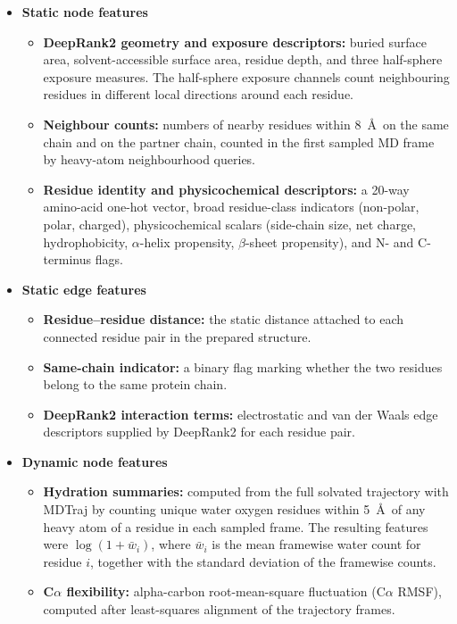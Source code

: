 \begin{itemize}
\item \textbf{Static node features}
  \begin{itemize}
  \item \textbf{DeepRank2 geometry and exposure descriptors:} buried surface area, solvent-accessible surface area, residue depth, and three half-sphere exposure measures. The half-sphere exposure channels count neighbouring residues in different local directions around each residue.
  \item \textbf{Neighbour counts:} numbers of nearby residues within 8~\AA\ on the same chain and on the partner chain, counted in the first sampled MD frame by heavy-atom neighbourhood queries.
  \item \textbf{Residue identity and physicochemical descriptors:} a 20-way amino-acid one-hot vector, broad residue-class indicators (non-polar, polar, charged), physicochemical scalars (side-chain size, net charge, hydrophobicity, $\alpha$-helix propensity, $\beta$-sheet propensity), and N- and C-terminus flags.
  \end{itemize}
\item \textbf{Static edge features}
  \begin{itemize}
  \item \textbf{Residue--residue distance:} the static distance attached to each connected residue pair in the prepared structure.
  \item \textbf{Same-chain indicator:} a binary flag marking whether the two residues belong to the same protein chain.
  \item \textbf{DeepRank2 interaction terms:} electrostatic and van der Waals edge descriptors supplied by DeepRank2 for each residue pair.
  \end{itemize}
\item \textbf{Dynamic node features}
  \begin{itemize}
  \item \textbf{Hydration summaries:} computed from the full solvated trajectory with MDTraj \citep{McGibbon2015MDTraj} by counting unique water oxygen residues within 5~\AA\ of any heavy atom of a residue in each sampled frame. The resulting features were $\log(1+\bar{w}_i)$, where $\bar{w}_i$ is the mean framewise water count for residue $i$, together with the standard deviation of the framewise counts.
  \item \textbf{C$\alpha$ flexibility:} alpha-carbon root-mean-square fluctuation (C$\alpha$ RMSF), computed after least-squares alignment of the trajectory frames.

\end{itemize}
\end{itemize}
